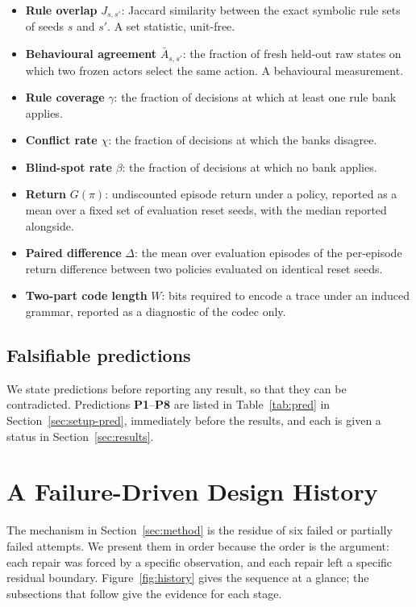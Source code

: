 \documentclass[11pt,a4paper]{article}
\begin{document}
\begin{itemize}
  \item \textbf{Rule overlap} $J_{s,s'}$: Jaccard similarity between the exact symbolic rule sets of seeds $s$ and $s'$. A set statistic, unit-free.
  \item \textbf{Behavioural agreement} $\bar{A}_{s,s'}$: the fraction of fresh held-out raw states on which two frozen actors select the same action. A behavioural measurement.
  \item \textbf{Rule coverage} $\gamma$: the fraction of decisions at which at least one rule bank applies.
  \item \textbf{Conflict rate} $\chi$: the fraction of decisions at which the banks disagree.
  \item \textbf{Blind-spot rate} $\beta$: the fraction of decisions at which no bank applies.
  \item \textbf{Return} $G(\pi)$: undiscounted episode return under a policy, reported as a mean over a fixed set of evaluation reset seeds, with the median reported alongside.
  \item \textbf{Paired difference} $\Delta$: the mean over evaluation episodes of the per-episode return difference between two policies evaluated on identical reset seeds.
  \item \textbf{Two-part code length} $W$: bits required to encode a trace under an induced grammar, reported as a diagnostic of the codec only.
\end{itemize}

\subsection{Falsifiable predictions}

We state predictions before reporting any result, so that they can be contradicted. Predictions \textbf{P1}--\textbf{P8} are listed in Table~\ref{tab:pred} in Section~\ref{sec:setup-pred}, immediately before the results, and each is given a status in Section~\ref{sec:results}.

\section{A Failure-Driven Design History}
\label{sec:history}

The mechanism in Section~\ref{sec:method} is the residue of six failed or partially failed attempts. We present them in order because the order is the argument: each repair was forced by a specific observation, and each repair left a specific residual boundary. Figure~\ref{fig:history} gives the sequence at a glance; the subsections that follow give the evidence for each stage.
\end{document}

